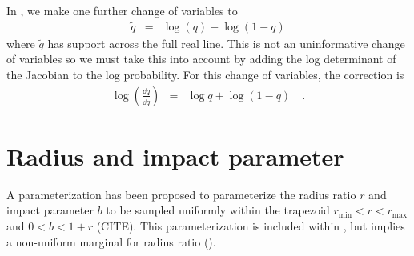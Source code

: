 \documentclass[modern]{aastex62}
\begin{document}
In \exoplanet, we make one further change of variables to
\begin{eqnarray}
\tilde{q} &=& \log(q) - \log(1-q)
\end{eqnarray}
where $\tilde{q}$ has support across the full real line.
This is not an uninformative change of variables so we must take this into account by adding the log determinant of the Jacobian to the log probability.
For this change of variables, the correction is
\begin{eqnarray}
\log\left(\frac{\dd q}{\dd\tilde{q}}\right) &=& \log q + \log(1 - q) \quad.
\end{eqnarray}

\section{Radius and impact parameter}

A parameterization has been proposed to parameterize the radius ratio $r$ and impact parameter $b$ to be sampled uniformly within the trapezoid $r_\mathrm{min} < r < r_\mathrm{max}$ and $0 < b < 1 + r$ (CITE).
This parameterization is included within \exoplanet, but implies a non-uniform marginal for radius ratio ().
\end{document}
